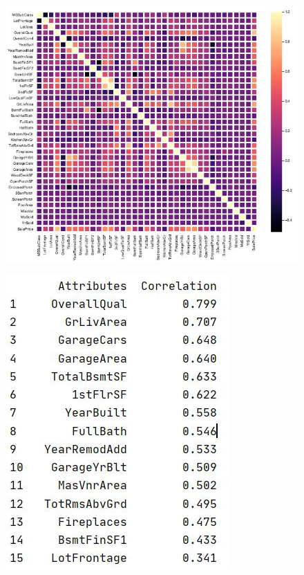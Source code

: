 \documentclass[onecolumn]{article}
\begin{document}
\begin{figure}[h]
\centering
\begin{minipage}{.6\textwidth}
  \centering
  \includegraphics[width=.7\linewidth]{correlation.jpg}
  \label{fig:correlation}
\end{minipage}%
\begin{minipage}{.4\textwidth}
  \centering
  \includegraphics[width=.7\linewidth]{corr_output.jpg}
  \label{fig:corr_output}
\end{minipage}
\end{figure}
\end{document}
